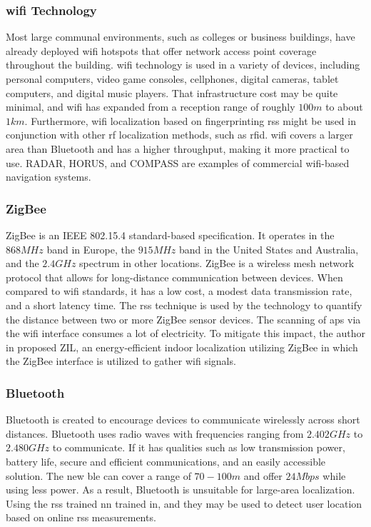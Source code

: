 \subsubsection{\ac{wifi} Technology}
Most large communal environments, such as colleges or business buildings, have already deployed \ac{wifi} hotspots that offer network access point coverage throughout the building.
\ac{wifi} technology is used in a variety of devices, including personal computers, video game consoles, cellphones, digital cameras, tablet computers, and digital music players.
That infrastructure cost may be quite minimal, and \ac{wifi} has expanded from a reception range of roughly $100 m$ to about $1 km$.
Furthermore, \ac{wifi} localization based on fingerprinting \ac{rss} might be used in conjunction with other \ac{rf} localization methods, such as \ac{rfid}\cite{wang2016indoor}.
\ac{wifi} covers a larger area than Bluetooth and has a higher throughput, making it more practical to use.
RADAR\cite{bahl2000radar}, HORUS\cite{bahl2000radar}, and COMPASS\cite{bahl2000radar} are examples of commercial \ac{wifi}-based navigation systems.

\subsubsection{ZigBee}
ZigBee is an IEEE 802.15.4 standard-based specification.
It operates in the $868 MHz$ band in Europe, the $915 MHz$ band in the United States and Australia, and the $2.4 GHz$ spectrum in other locations.
ZigBee is a wireless mesh network protocol that allows for long-distance communication between devices.
When compared to \ac{wifi} standards, it has a low cost, a modest data transmission rate, and a short latency time.
The \ac{rss} technique is used by the technology to quantify the distance between two or more ZigBee sensor devices\cite{sugano2006indoor}.
The scanning of \ac{ap}s via the \ac{wifi} interface consumes a lot of electricity.
To mitigate this impact, the author in\cite{niu2015zil} proposed ZIL, an energy-efficient indoor localization utilizing ZigBee in which the ZigBee interface is utilized to gather \ac{wifi} signals.

\subsubsection{Bluetooth}
Bluetooth is created to encourage devices to communicate wirelessly across short distances.
Bluetooth uses radio waves with frequencies ranging from $2.402 GHz$ to $2.480 GHz$ to communicate.
If it has qualities such as low transmission power, battery life, secure and efficient communications, and an easily accessible solution.
The new \ac{ble} can cover a range of $70-100 m$ and offer $24Mbps$ while using less power\cite{zafari2019survey}.
As a result, Bluetooth is unsuitable for large-area localization.
Using the \ac{rss} trained \ac{nn} trained in\cite{Altini2010BluetoothIL}, and they may be used to detect user location based on online \ac{rss} measurements.

